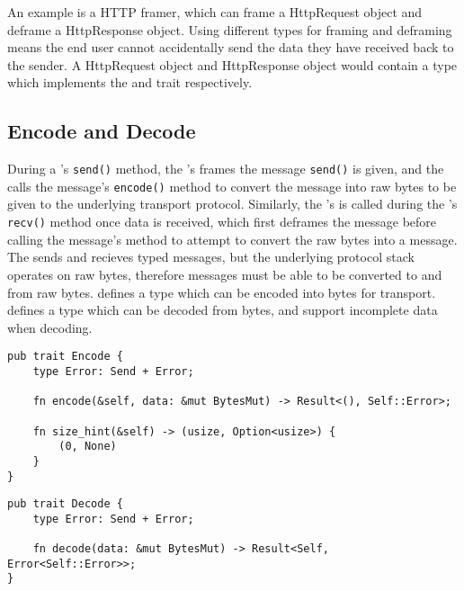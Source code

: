 An example is a HTTP framer, which can frame a HttpRequest object and deframe a HttpResponse object.
Using different types for framing and deframing means the end user cannot accidentally send the data they have received
back to the sender.
A HttpRequest object and HttpResponse object would contain a type which implements the \encode{} and \decode{}
trait respectively.

\subsection{Encode and Decode}\label{subsec:encode-and-decode}
During a \connection{}'s \texttt{send()} method, the \connection{}'s \framer{} frames the message \texttt{send()} is
given, and the \framer{} calls the message's \texttt{encode()} method to convert the message into raw bytes to be given
to the underlying transport protocol.
Similarly, the \connection{}'s \framer{} is called during the \connection{}'s \texttt{recv()} method once data is
received, which first deframes the message before calling the message's \decode{} method to attempt to convert the
raw bytes into a message.
The \connection{} sends and recieves typed messages, but the underlying protocol stack operates on raw bytes,
therefore messages must be able to be converted to and from raw bytes.
\encode{} defines a type which can be encoded into bytes for transport.
\decode{} defines a type which can be decoded from bytes, and support incomplete data when decoding.

\begin{lstlisting}[float=h, label=lst:encode, caption={The Encode trait, showing the size\_hint method.}]
pub trait Encode {
    type Error: Send + Error;

    fn encode(&self, data: &mut BytesMut) -> Result<(), Self::Error>;

    fn size_hint(&self) -> (usize, Option<usize>) {
        (0, None)
    }
}
\end{lstlisting}

\begin{lstlisting}[float=h, label=lst:decode, caption={The Decode trait.}]
pub trait Decode {
    type Error: Send + Error;

    fn decode(data: &mut BytesMut) -> Result<Self, Error<Self::Error>>;
}
\end{lstlisting}

